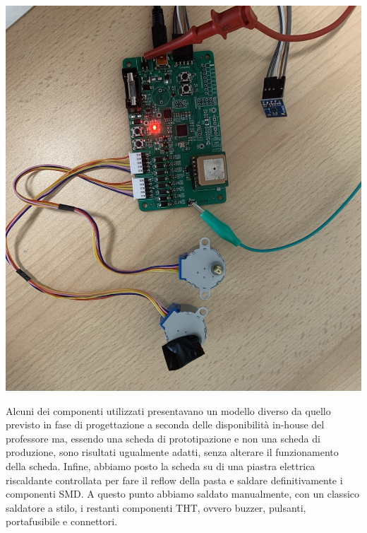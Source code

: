 \begin{center}
\includegraphics[scale=0.4]{figures/image101.png}
\captionsetup{type=figure}
\end{center}

\noindent Alcuni dei componenti utilizzati presentavano un modello diverso da quello previsto
in fase di progettazione a seconda delle disponibilità in-house del professore ma, 
essendo una scheda di prototipazione e non una scheda di produzione, sono risultati 
ugualmente adatti, senza alterare il funzionamento della scheda. Infine, abbiamo posto
la scheda su di una piastra elettrica riscaldante controllata per fare il reflow della 
pasta e saldare definitivamente i componenti SMD. A questo punto abbiamo saldato manualmente, 
con un classico saldatore a stilo, i restanti componenti THT, ovvero buzzer, pulsanti, portafusibile e connettori.

